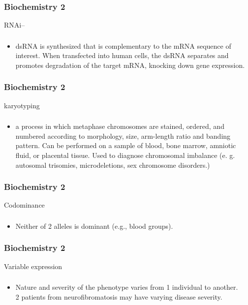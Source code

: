 \documentclass[11pt]{beamer}
\begin{document}
\begin{frame}
 \frametitle{Biochemistry 2}
RNAi–
\end{frame}

\begin{frame}
 \frametitle{}
\begin{itemize}
\item dsRNA is synthesized that is complementary to the mRNA sequence of interest. When transfected into human cells, the dsRNA separates and promotes degradation of the target mRNA, knocking down gene expression.
\end{itemize}
\end{frame}

\begin{frame}
 \frametitle{Biochemistry 2}
karyotyping
\end{frame}

\begin{frame}
 \frametitle{}
\begin{itemize}
\item a process in which metaphase chromosomes are stained, ordered, and numbered according to morphology, size, arm-length ratio and banding pattern. Can be performed on a sample of blood, bone marrow, amniotic fluid, or placental tissue. Used to diagnose chromosomal imbalance (e. g. autosomal trisomies, microdeletions, sex chromosome disorders.) 
\end{itemize}
\end{frame}

\begin{frame}
 \frametitle{Biochemistry 2}
Codominance
\end{frame}

\begin{frame}
 \frametitle{}
\begin{itemize}
\item Neither of 2 alleles is dominant (e.g., blood groups).
\end{itemize}
\end{frame}

\begin{frame}
 \frametitle{Biochemistry 2}
Variable expression
\end{frame}

\begin{frame}
 \frametitle{}
\begin{itemize}
\item Nature and severity of the phenotype varies from 1 individual to another. \\ 2 patients from neurofibromatosis may have varying disease severity. 
\end{itemize}
\end{frame}
\end{document}
